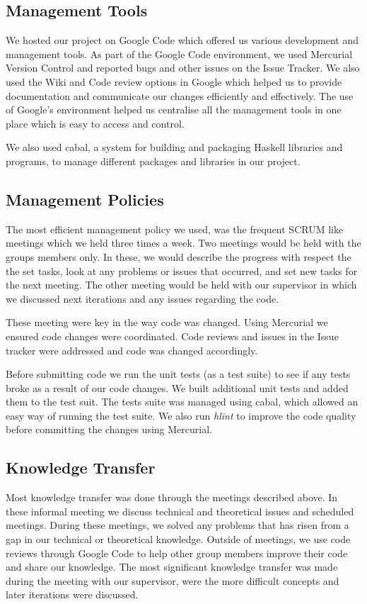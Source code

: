 \subsection*{Management Tools}

We hosted our project on Google Code which offered us various development and management tools. As part of the Google Code environment, we used Mercurial Version Control and reported bugs and other issues on the Issue Tracker. We also used the Wiki and Code review options in Google which helped us to provide documentation and communicate our changes efficiently and effectively. The use of Google's environment helped us centralise all the management tools in one place which is easy to access and control.

We also used cabal, a system for building and packaging Haskell libraries and programs, to manage different packages and libraries in our project. 

\subsection*{Management Policies}

The most efficient management policy we used, was the frequent SCRUM like meetings which we held three times a week. Two meetings would be held with the groups members only. In these, we would describe the progress with respect the the set tasks, look at any problems or issues that occurred, and set new tasks for the next meeting. The other meeting would be held with our supervisor in which we discussed next iterations and any issues regarding the code. 

These meeting were key in the way code was changed. Using Mercurial we ensured code changes were coordinated. Code reviews and issues in the Issue tracker were addressed and code was changed accordingly. 

Before submitting code we run the unit tests (as a test suite) to see if any tests broke as a result of our code changes. We built additional unit tests and added them to the test suit. The tests suite was managed using cabal, which allowed an easy way of running the test suite. We also run \emph{hlint} to improve the code quality before committing the changes using Mercurial. 

\subsection*{Knowledge Transfer}

Most knowledge transfer was done through the meetings described above. In these informal meeting we discuss technical and theoretical issues
and scheduled meetings. During these meetings, we solved any problems that has risen
from a gap in our technical or theoretical knowledge. Outside of meetings, we use code
reviews through Google Code to help other group members improve their code and share
our knowledge. The most significant knowledge transfer was made during the meeting with our supervisor, were the more difficult concepts and later iterations were discussed.


